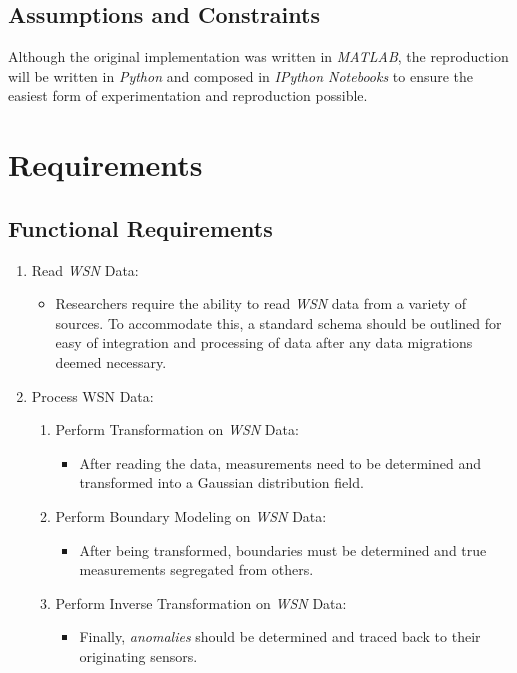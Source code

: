 \documentclass[twoside]{article}
\begin{document}
\begin{multicols}{2}
\subsection{Assumptions and Constraints}
Although the original implementation was written in \textit{MATLAB}, the reproduction will be written in \textit{Python} and composed in \textit{IPython Notebooks} to ensure the easiest form of experimentation and reproduction possible.

\section{Requirements}

\subsection{Functional Requirements}
\begin{enumerate}
	\item Read \textit{WSN} Data:
		\begin{itemize}
			\item Researchers require the ability to read \textit{WSN} data from a variety of sources. To accommodate this, a standard schema should be outlined for easy of integration and processing of data after any data migrations deemed necessary.
		\end{itemize}
	\item Process WSN Data:
		\begin{enumerate}
			\item Perform Transformation on \textit{WSN} Data:
				\begin{itemize}
					\item After reading the data, measurements need to be determined and transformed into a Gaussian distribution field.
				\end{itemize}
			\item Perform Boundary Modeling on \textit{WSN} Data:
				\begin{itemize}
					\item After being transformed, boundaries must be determined and true measurements segregated from others.
				\end{itemize}
			\item Perform Inverse Transformation on \textit{WSN} Data:
				\begin{itemize}
					\item Finally, \textit{anomalies} should be determined and traced back to their originating sensors.

\end{itemize}
\end{enumerate}
\end{enumerate}
\end{multicols}
\end{document}
